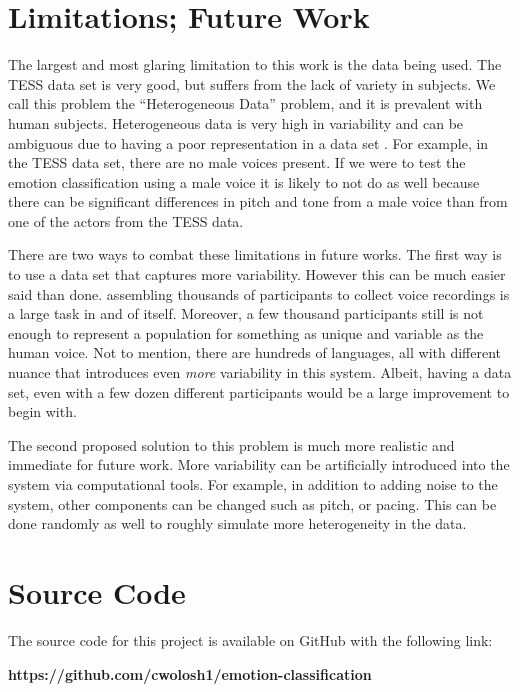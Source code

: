 \documentclass[12pt]{article}
\begin{document}
\begin{multicols*}{2}
\section*{Limitations; Future Work}
The largest and most glaring limitation to this work is the data being used. The TESS data set is very good, but suffers from the lack of variety in subjects. We call this problem the ``Heterogeneous Data'' problem, and it is prevalent with human subjects. Heterogeneous data is very high in variability and can be ambiguous due to having a poor representation in a data set \cite{wang2017heterogeneous}. For example, in the TESS data set, there are no male voices present. If we were to test the emotion classification using a male voice it is likely to not do as well because there can be significant differences in pitch and tone from a male voice than from one of the actors from the TESS data.

There are two ways to combat these limitations in future works. The first way is to use a data set that captures more variability. However this can be much easier said than done. assembling thousands of participants to collect voice recordings is a large task in and of itself. Moreover, a few thousand participants still is not enough to represent a population for something as unique and variable as the human voice. Not to mention, there are hundreds of languages, all with different nuance that introduces even \emph{more} variability in this system. Albeit, having a data set, even with a few dozen different participants would be a large improvement to begin with.

The second proposed solution to this problem is much more realistic and immediate for future work. More variability can be artificially introduced into the system via computational tools. For example, in addition to adding noise to the system, other components can be changed such as pitch, or pacing. This can be done randomly as well to roughly simulate more heterogeneity in the data.

\appendix
\section{Source Code}
The source code for this project is available on GitHub with the following link:
\begin{center}
\bf{https://github.com/cwolosh1/emotion-classification}
\end{center}



\end{multicols*}
\end{document}
